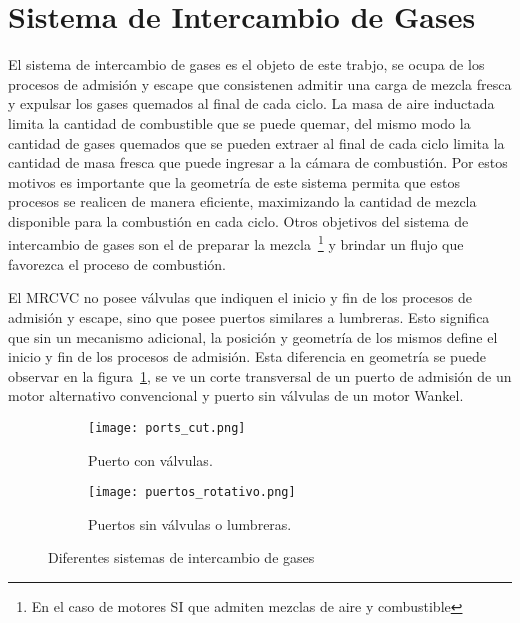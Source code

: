 \section{Sistema de Intercambio de Gases}
%
El sistema de intercambio de gases es el objeto de este trabjo, se ocupa de los
procesos de admisión y escape que consistenen admitir una carga de mezcla
fresca y expulsar los gases quemados al final de cada ciclo.
%
La masa de aire inductada limita la cantidad de combustible que se puede
quemar, del mismo modo la cantidad de gases quemados que se pueden extraer
al final de cada ciclo limita la cantidad de masa fresca que puede ingresar a
la cámara de combustión.
%
Por estos motivos es importante que la geometría de este sistema permita que
estos procesos se realicen de manera eficiente, maximizando la cantidad de mezcla
disponible para la combustión en cada ciclo.
%
Otros objetivos del sistema de intercambio de gases son el de preparar la
mezcla~\footnote{En el caso de motores SI que admiten mezclas de aire y
combustible} y brindar un flujo que favorezca el proceso de combustión.



El MRCVC no posee válvulas que indiquen el inicio y fin de los procesos de
admisión y escape, sino que posee puertos similares a lumbreras.
%
Esto significa que sin un mecanismo adicional, la posición y geometría de los
mismos define el inicio y fin de los procesos de admisión.
%
Esta diferencia en geometría se puede observar en la
figura~\ref{fig:puerto_valvula}, se ve un corte transversal de un puerto de
admisión de un motor alternativo convencional y puerto sin válvulas de un
motor Wankel.

\begin{figure}
  \centering
  \begin{subfigure}{.4\textwidth}
    \centering
    \texttt{[image: ports\_cut.png]}
    \caption{Puerto con válvulas.}
  \end{subfigure}
  \hfill
  \begin{subfigure}{.4\textwidth}
    \centering
    \texttt{[image: puertos\_rotativo.png]}
    \caption{Puertos sin válvulas o lumbreras.}
  \end{subfigure}
  \caption{Diferentes sistemas de intercambio de gases}\label{fig:puerto_valvula}
\end{figure}

